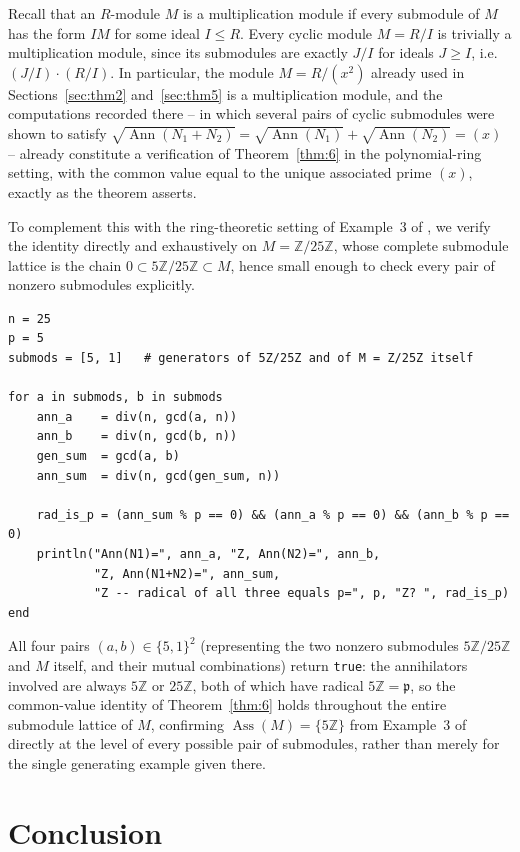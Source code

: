 \documentclass[11pt]{article}
\newcommand{\Ann}{\operatorname{Ann}}
\begin{document}
Recall that an $R$-module $M$ is a multiplication module if every
submodule of $M$ has the form $IM$ for some ideal $I\le R$. Every cyclic
module $M=R/I$ is trivially a multiplication module, since its
submodules are exactly $J/I$ for ideals $J\ge I$, i.e.\ $(J/I)\cdot(R/I)$.
In particular, the module $M=R/(x^2)$ already used in
Sections~\ref{sec:thm2} and~\ref{sec:thm5} is a multiplication module, and the
computations recorded there -- in which several pairs of cyclic
submodules were shown to satisfy
$\sqrt{\Ann(N_1+N_2)}=\sqrt{\Ann(N_1)}+\sqrt{\Ann(N_2)}=(x)$ -- already
constitute a verification of Theorem~\ref{thm:6} in the polynomial-ring
setting, with the common value equal to the unique associated prime
$(x)$, exactly as the theorem asserts.

To complement this with the ring-theoretic setting of Example~3 of
\cite{pekin-ozkaya-2026}, we verify the identity directly and
exhaustively on $M=\mathbb Z/25\mathbb Z$, whose complete submodule
lattice is the chain $0 \subset 5\mathbb Z/25\mathbb Z \subset M$, hence
small enough to check every pair of nonzero submodules explicitly.

\begin{lstlisting}
n = 25
p = 5
submods = [5, 1]   # generators of 5Z/25Z and of M = Z/25Z itself

for a in submods, b in submods
    ann_a    = div(n, gcd(a, n))
    ann_b    = div(n, gcd(b, n))
    gen_sum  = gcd(a, b)
    ann_sum  = div(n, gcd(gen_sum, n))

    rad_is_p = (ann_sum % p == 0) && (ann_a % p == 0) && (ann_b % p == 0)
    println("Ann(N1)=", ann_a, "Z, Ann(N2)=", ann_b,
            "Z, Ann(N1+N2)=", ann_sum,
            "Z -- radical of all three equals p=", p, "Z? ", rad_is_p)
end
\end{lstlisting}

All four pairs $(a,b)\in\{5,1\}^2$ (representing the two nonzero
submodules $5\mathbb Z/25\mathbb Z$ and $M$ itself, and their mutual
combinations) return \texttt{true}: the annihilators involved are always
$5\mathbb Z$ or $25\mathbb Z$, both of which have radical $5\mathbb Z=
\mathfrak p$, so the common-value identity of Theorem~\ref{thm:6} holds
throughout the entire submodule lattice of $M$, confirming
$\operatorname{Ass}(M)=\{5\mathbb Z\}$ from Example~3 of
\cite{pekin-ozkaya-2026} directly at the level of every possible pair of
submodules, rather than merely for the single generating example given
there.

\section{Conclusion}
\end{document}
